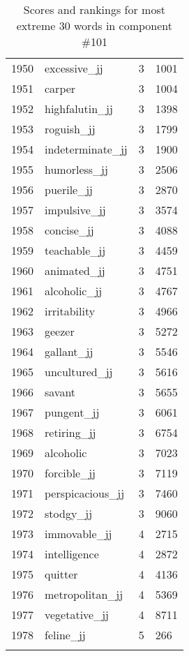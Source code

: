 \begin{longtable}[!htbp]{| rlr@{.}l |}
    1950 & excessive\_jj & 3 & 1001 \\
    1951 & carper & 3 & 1004 \\
    1952 & highfalutin\_jj & 3 & 1398 \\
    1953 & roguish\_jj & 3 & 1799 \\
    1954 & indeterminate\_jj & 3 & 1900 \\
    1955 & humorless\_jj & 3 & 2506 \\
    1956 & puerile\_jj & 3 & 2870 \\
    1957 & impulsive\_jj & 3 & 3574 \\
    1958 & concise\_jj & 3 & 4088 \\
    1959 & teachable\_jj & 3 & 4459 \\
    1960 & animated\_jj & 3 & 4751 \\
    1961 & alcoholic\_jj & 3 & 4767 \\
    1962 & irritability & 3 & 4966 \\
    1963 & geezer & 3 & 5272 \\
    1964 & gallant\_jj & 3 & 5546 \\
    1965 & uncultured\_jj & 3 & 5616 \\
    1966 & savant & 3 & 5655 \\
    1967 & pungent\_jj & 3 & 6061 \\
    1968 & retiring\_jj & 3 & 6754 \\
    1969 & alcoholic & 3 & 7023 \\
    1970 & forcible\_jj & 3 & 7119 \\
    1971 & perspicacious\_jj & 3 & 7460 \\
    1972 & stodgy\_jj & 3 & 9060 \\
    1973 & immovable\_jj & 4 & 2715 \\
    1974 & intelligence & 4 & 2872 \\
    1975 & quitter & 4 & 4136 \\
    1976 & metropolitan\_jj & 4 & 5369 \\
    1977 & vegetative\_jj & 4 & 8711 \\
    1978 & feline\_jj & 5 & 266 \\
    \hline
    \caption{Scores and rankings for most extreme 30 words in component \#101} \\
\end{longtable}
